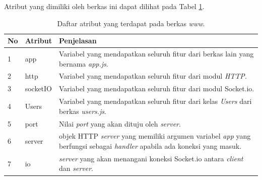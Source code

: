 \begin{enumerate}
\begin{enumerate}
		Atribut yang dimiliki oleh berkas ini dapat dilihat pada Tabel \ref{table:atribut_www}.
		\begin{table}[H]
			\centering
			\caption{Daftar atribut yang terdapat pada berkas \textit{www}.}
			\begin{tabular}{|p{0.35cm}|p{3cm}|p{7cm}|}
				\hline
				No & Atribut & Penjelasan \\ \hline
				1 & app & Variabel yang mendapatkan seluruh fitur dari berkas lain yang bernama \textit{app.js}. \\ \hline
				2 & http & Variabel yang mendapatkan seluruh fitur dari modul \textit{HTTP}. \\ \hline
				3 & socketIO & Variabel yang mendapatkan seluruh fitur dari modul Socket.io. \\ \hline
				4 & {Users} & Variabel yang mendapatkan seluruh fitur dari kelas \textit{Users} dari berkas \textit{users.js}. \\ \hline
				5 & port & Nilai \textit{port} yang akan dituju oleh \textit{server}. \\ \hline
				6 & server & objek HTTP \textit{server} yang memiliki argumen variabel \textit{app} yang berfungsi sebagai \textit{handler} apabila ada koneksi yang masuk. \\ \hline
				7 & io & \textit{server} yang akan menangani koneksi Socket.io antara \textit{client} dan \textit{server}. \\ \hline				
			\end{tabular}
			\label{table:atribut_www}
		\end{table}
	

\end{enumerate}
\end{enumerate}
